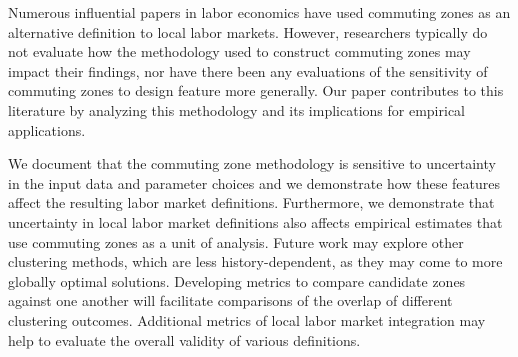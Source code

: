 Numerous influential papers in labor economics have used commuting zones as an alternative definition to local labor markets. However, researchers typically do not evaluate how the methodology used to construct commuting zones may impact their findings, nor have there been any evaluations of the sensitivity of commuting zones to design feature more generally. Our paper contributes to this literature by analyzing this methodology and its implications for empirical applications.

We document that the commuting zone methodology is sensitive to uncertainty in the input data and parameter choices and we demonstrate how these features affect the resulting labor market definitions. Furthermore, we demonstrate that uncertainty in local labor market definitions also affects empirical estimates that use commuting zones as a unit of analysis. Future work may explore other clustering methods, which are less history-dependent, as they may come to more globally optimal solutions. Developing metrics to compare candidate zones against one another will facilitate comparisons of the overlap of different clustering outcomes. Additional metrics of local labor market integration may help to evaluate the overall validity of various definitions.

